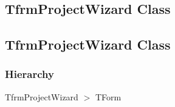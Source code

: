 \documentclass{report}
\begin{document}
\subsection*{\large{\textbf{TfrmProjectWizard Class}}\normalsize\hspace{1ex}\hrulefill}
\else
\subsection*{TfrmProjectWizard Class}
\fi
\label{prjwizard.TfrmProjectWizard}
\subsubsection*{\large{\textbf{Hierarchy}}\normalsize\hspace{1ex}\hfill}
TfrmProjectWizard {$>$} TForm
\end{document}
